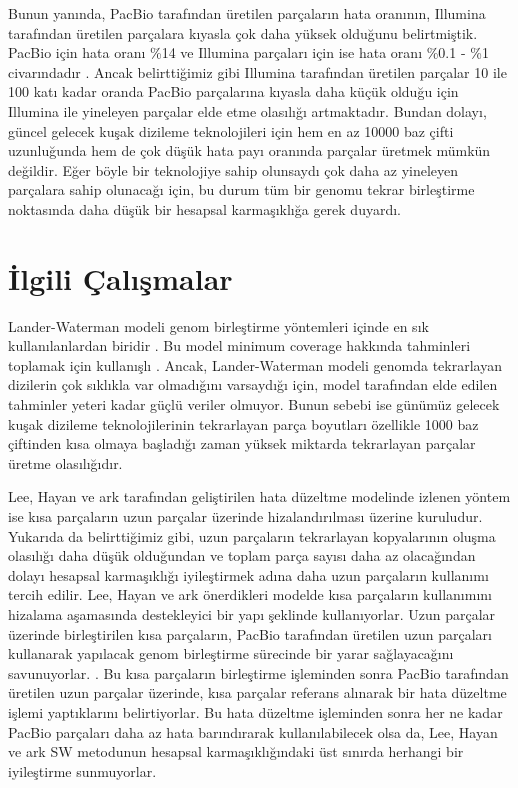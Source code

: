Bunun yanında, PacBio tarafından üretilen parçaların hata oranının, Illumina tarafından üretilen parçalara kıyasla çok daha yüksek olduğunu belirtmiştik. PacBio için hata oranı \%14 \cite{pacbioerr} ve Illumina parçaları için ise hata oranı \%0.1 - \%1 civarındadır \cite{lou}. Ancak belirttiğimiz gibi Illumina tarafından üretilen parçalar 10 ile 100 katı kadar oranda PacBio parçalarına kıyasla daha küçük olduğu için Illumina ile yineleyen parçalar elde etme olasılığı artmaktadır. Bundan dolayı, güncel gelecek kuşak dizileme teknolojileri için hem en az 10000 baz çifti uzunluğunda hem de çok düşük hata payı oranında parçalar üretmek mümkün değildir. Eğer böyle bir teknolojiye sahip olunsaydı çok daha az yineleyen parçalara sahip olunacağı için, bu durum tüm bir genomu tekrar birleştirme noktasında daha düşük bir hesapsal karmaşıklığa gerek duyardı. 

\section{İlgili Çalışmalar}

Lander-Waterman modeli genom birleştirme yöntemleri içinde en sık kullanılanlardan biridir \cite{lander}. Bu model minimum coverage hakkında tahminleri toplamak için kullanışlı \cite{lee2}. Ancak, Lander-Waterman modeli genomda tekrarlayan dizilerin çok sıklıkla var olmadığını varsaydığı için, model tarafından elde edilen tahminler yeteri kadar güçlü veriler olmuyor. Bunun sebebi ise günümüz gelecek kuşak dizileme teknolojilerinin tekrarlayan parça boyutları özellikle 1000 baz çiftinden kısa olmaya başladığı zaman yüksek miktarda tekrarlayan parçalar üretme olasılığıdır.

Lee, Hayan ve ark \cite{lee2} tarafından geliştirilen hata düzeltme modelinde izlenen yöntem ise kısa parçaların uzun parçalar üzerinde hizalandırılması üzerine kuruludur. Yukarıda da belirttiğimiz gibi, uzun parçaların tekrarlayan kopyalarının oluşma olasılığı daha düşük olduğundan ve toplam parça sayısı daha az olacağından dolayı hesapsal karmaşıklığı iyileştirmek adına daha uzun parçaların kullanımı tercih edilir. Lee, Hayan ve ark önerdikleri modelde kısa parçaların kullanımını hizalama aşamasında destekleyici bir yapı şeklinde kullanıyorlar. Uzun parçalar üzerinde birleştirilen kısa parçaların, PacBio tarafından üretilen uzun parçaları kullanarak yapılacak genom birleştirme sürecinde bir yarar sağlayacağını savunuyorlar. \cite{lee2}. Bu kısa parçaların birleştirme işleminden sonra PacBio tarafından üretilen uzun parçalar üzerinde, kısa parçalar referans alınarak bir hata düzeltme işlemi yaptıklarını belirtiyorlar. Bu hata düzeltme işleminden sonra her ne kadar PacBio parçaları daha az hata barındırarak kullanılabilecek olsa da, Lee, Hayan ve ark SW metodunun hesapsal karmaşıklığındaki üst sınırda herhangi bir iyileştirme sunmuyorlar.

